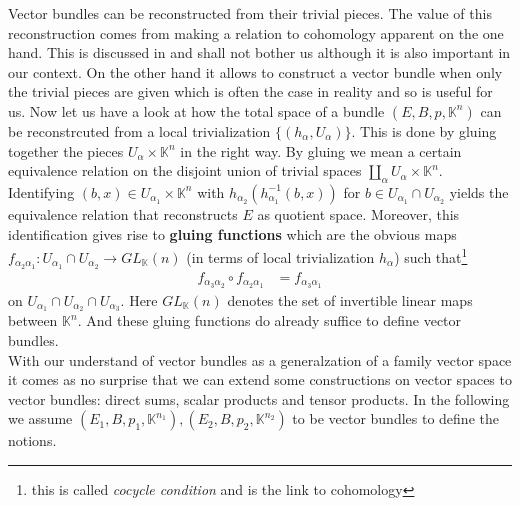 Vector bundles can be reconstructed from their trivial pieces. The value of this reconstruction comes from making a relation to cohomology apparent on the one hand. This is discussed in \cite{catctxphy} and shall not bother us although it is also important in our context. On the other hand it allows to construct a vector bundle when only the trivial pieces are given which is often the case in reality and so is useful for us. Now let us have a look at how the total space of a bundle $(E,B,p,\mathbb{K}^{n})$ can be reconstrcuted from a local trivialization $\lbrace (h_{\alpha},U_{\alpha}) \rbrace$. This is done by {\glqq}gluing together{\grqq} the pieces $U_{\alpha} \times \mathbb{K}^{n}$ in the right way. By gluing we mean a certain equivalence relation on the disjoint union of trivial spaces $\coprod_{\alpha}U_{\alpha} \times \mathbb{K}^{n}$. Identifying $(b,x) \in U_{\alpha_{1}} \times \mathbb{K}^{n}$ with $h_{\alpha_{2}}(h_{\alpha_{1}}^{-1}(b,x))$ for $b \in U_{\alpha_{1}} \cap U_{\alpha_{2}}$ yields the equivalence relation that reconstructs $E$ as quotient space. Moreover, this identification gives rise to \textbf{gluing functions} which are the obvious maps $f_{\alpha_{2}\alpha_{1}} \colon U_{\alpha_{1}} \cap U_{\alpha_{2}} \to GL_{\mathbb{K}}(n)$ (in terms of local trivialization $h_{\alpha}$) such that\footnote{this is called \textit{cocycle condition} and is the link to cohomology}
\begin{align*}
  f_{\alpha_{3}\alpha_{2}}
  \circ
  f_{\alpha_{2}\alpha_{1}}
  &=
  f_{\alpha_{3}\alpha_{1}}
\end{align*}
on $U_{\alpha_{1}} \cap U_{\alpha_{2}} \cap U_{\alpha_{3}}$. Here $GL_{\mathbb{K}}(n)$ denotes the set of invertible linear maps between $\mathbb{K}^{n}$. And these gluing functions do already suffice to define vector bundles.
\\
With our understand of vector bundles as a generalzation of a family vector space it comes as no surprise that we can extend some constructions on vector spaces to vector bundles: direct sums, scalar products and tensor products. In the following we assume $(E_{1},B,p_{1},\mathbb{K}^{n_{1}}),(E_{2},B,p_{2},\mathbb{K}^{n_{2}})$ to be vector bundles to define the notions. 
